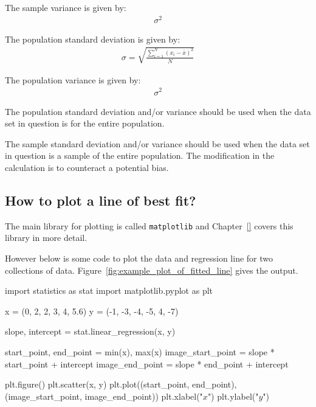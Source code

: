 The sample variance is given by:
\begin{equation*}
\begin{split}
\sigma ^ 2
\end{split}
\end{equation*}

The population standard deviation is given by:
\begin{equation*}
\begin{split}
\sigma = \sqrt{\frac{\sum_{i=1}^N{(x_i - \bar x) ^ 2}}{N}}
\end{split}
\end{equation*}

The population variance is given by:
\begin{equation*}
\begin{split}
\sigma ^ 2
\end{split}
\end{equation*}

The population standard deviation and/or variance should be used when the data set in question
is for the entire population.


The sample standard deviation and/or variance should be used when the data set in question is a
sample of the entire population. The modification in the calculation is to
counteract a potential bias.


\subsection{How to plot a line of best fit?}
\label{\detokenize{tools-for-mathematics/08-statistics/why/main:how-do-we-plot-a-line-of-best-fit}}

The main library for plotting is called \texttt{matplotlib} and
Chapter~\ref{} covers this library in more detail.


However below is some code to plot the data and regression line for two
collections of data. Figure~\ref{fig:example_plot_of_fitted_line} gives the output.

\begin{pyin}
import statistics as stat
import matplotlib.pyplot as plt

x = (0, 2, 2, 3, 4, 5.6)
y = (-1, -3, -4, -5, 4, -7)

slope, intercept = stat.linear_regression(x, y)

start_point, end_point = min(x), max(x)
image_start_point = slope * start_point + intercept
image_end_point = slope * end_point + intercept

plt.figure()
plt.scatter(x, y)
plt.plot((start_point, end_point), (image_start_point, image_end_point))
plt.xlabel("$x$")
plt.ylabel("$y$")
\end{pyin}


